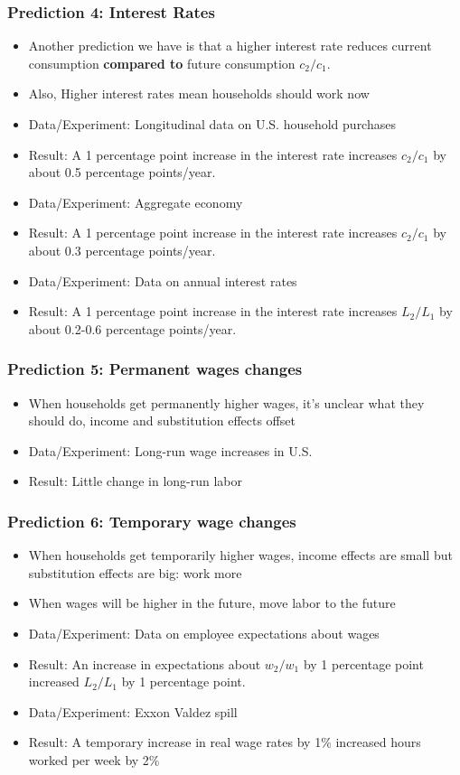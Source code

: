 \documentclass{beamer}
\begin{document}
\begin{frame}
\frametitle{Prediction 4: Interest Rates}
\begin{itemize}
\item Another prediction we have is that a higher interest rate reduces current consumption \textbf{compared to} future consumption $c_2/c_1$.  
\item Also, Higher interest rates mean households should work now
\bigskip
\item Data/Experiment:  Longitudinal data on U.S. household purchases
\bigskip
\item Result:  A 1 percentage point increase in the interest rate increases $c_2/c_1$ by about 0.5 percentage points/year.
\bigskip
\item Data/Experiment:  Aggregate economy
\bigskip
\item Result:  A 1 percentage point increase in the interest rate increases $c_2/c_1$ by about 0.3 percentage points/year.
\bigskip
\item Data/Experiment:  Data on annual interest rates
\bigskip
\item Result:  A 1 percentage point increase in the interest rate increases $L_2/L_1$ by about 0.2-0.6 percentage points/year.
\end{itemize}
\end{frame}


\begin{frame}
\frametitle{Prediction 5: Permanent wages changes}
\begin{itemize}
\item When households get permanently higher wages, it's unclear what they should do, income and substitution effects offset  
\bigskip
\item Data/Experiment:  Long-run wage increases in U.S.
\bigskip
\item Result:  Little change in long-run labor
\end{itemize}
\end{frame}

\begin{frame}
\frametitle{Prediction 6: Temporary wage changes}
\begin{itemize}
\item When households get temporarily higher wages, income effects are small but substitution effects are big: work more
\item When wages will be higher in the future, move labor to the future
\bigskip
\item Data/Experiment:  Data on employee expectations about wages
\bigskip
\item Result:  An increase in expectations about $w_2/w_1$ by 1 percentage point increased $L_2/L_1$ by 1 percentage point.
\bigskip
\item Data/Experiment:  Exxon Valdez spill
\bigskip
\item Result:  A temporary increase in real wage rates by 1\% increased hours worked per week by 2\%
\end{itemize}
\end{frame}
\end{document}
